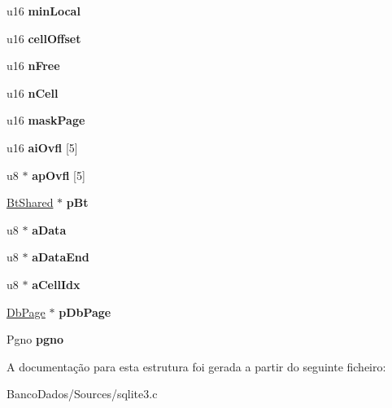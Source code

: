 \begin{DoxyCompactItemize}
\item 
\hypertarget{struct_mem_page_a95cab31aa57bf8b478be273557c5c807}{u16 {\bfseries min\-Local}}\label{struct_mem_page_a95cab31aa57bf8b478be273557c5c807}

\item 
\hypertarget{struct_mem_page_a324ed834d93c3ae72994fb5730940521}{u16 {\bfseries cell\-Offset}}\label{struct_mem_page_a324ed834d93c3ae72994fb5730940521}

\item 
\hypertarget{struct_mem_page_a3418a9aee707f57a73d8470f8a1228a8}{u16 {\bfseries n\-Free}}\label{struct_mem_page_a3418a9aee707f57a73d8470f8a1228a8}

\item 
\hypertarget{struct_mem_page_a35d1d8f836201b82b1eb778ce0e324f4}{u16 {\bfseries n\-Cell}}\label{struct_mem_page_a35d1d8f836201b82b1eb778ce0e324f4}

\item 
\hypertarget{struct_mem_page_aa3d64e8755cc9f431bbc8423a2b506ec}{u16 {\bfseries mask\-Page}}\label{struct_mem_page_aa3d64e8755cc9f431bbc8423a2b506ec}

\item 
\hypertarget{struct_mem_page_a857e00533053fe6017c6e08b1b240661}{u16 {\bfseries ai\-Ovfl} \mbox{[}5\mbox{]}}\label{struct_mem_page_a857e00533053fe6017c6e08b1b240661}

\item 
\hypertarget{struct_mem_page_a3a6347d06b1e85938605d9a44f193cb9}{u8 $\ast$ {\bfseries ap\-Ovfl} \mbox{[}5\mbox{]}}\label{struct_mem_page_a3a6347d06b1e85938605d9a44f193cb9}

\item 
\hypertarget{struct_mem_page_a949df1156f7392592eaeb64389068f99}{\hyperlink{struct_bt_shared}{Bt\-Shared} $\ast$ {\bfseries p\-Bt}}\label{struct_mem_page_a949df1156f7392592eaeb64389068f99}

\item 
\hypertarget{struct_mem_page_a2d873eff563d2208be0c24959140a4b0}{u8 $\ast$ {\bfseries a\-Data}}\label{struct_mem_page_a2d873eff563d2208be0c24959140a4b0}

\item 
\hypertarget{struct_mem_page_ab5d2ecb95a84eaf4bd0ccef536bac6d7}{u8 $\ast$ {\bfseries a\-Data\-End}}\label{struct_mem_page_ab5d2ecb95a84eaf4bd0ccef536bac6d7}

\item 
\hypertarget{struct_mem_page_a6f391f110e68ede6e5234b4e9f678f99}{u8 $\ast$ {\bfseries a\-Cell\-Idx}}\label{struct_mem_page_a6f391f110e68ede6e5234b4e9f678f99}

\item 
\hypertarget{struct_mem_page_add322c1aed91e95d8dfe3ac3535d65b4}{\hyperlink{struct_pg_hdr}{Db\-Page} $\ast$ {\bfseries p\-Db\-Page}}\label{struct_mem_page_add322c1aed91e95d8dfe3ac3535d65b4}

\item 
\hypertarget{struct_mem_page_ad2b0c532abc799bbcf3b43df4f0b0546}{Pgno {\bfseries pgno}}\label{struct_mem_page_ad2b0c532abc799bbcf3b43df4f0b0546}

\end{DoxyCompactItemize}


A documentação para esta estrutura foi gerada a partir do seguinte ficheiro\-:\begin{DoxyCompactItemize}
\item 
Banco\-Dados/\-Sources/sqlite3.\-c\end{DoxyCompactItemize}
